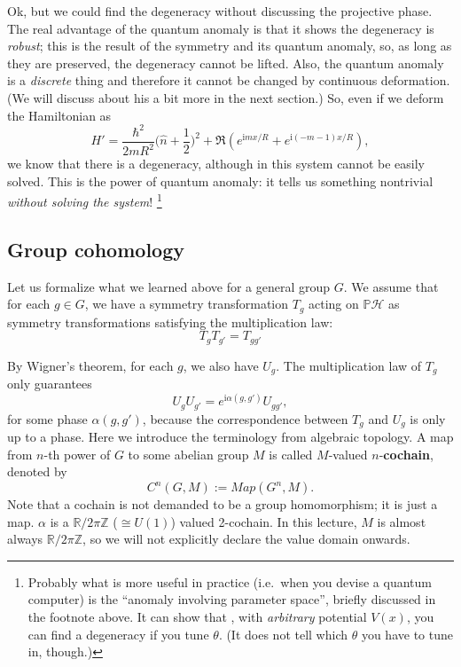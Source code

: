 \documentclass[
]{scrartcl}
\numberwithin{equation}{section}
\theoremstyle{definition}
\theoremstyle{definition}
\theoremstyle{definition}
\theoremstyle{definition}
\theoremstyle{remark}
\begin{document}
Ok, but we could find the degeneracy without discussing the projective phase. The real advantage of the quantum anomaly is that it shows the degeneracy is \emph{robust}; this is the result of the symmetry and its quantum anomaly, so, as long as they are preserved, the degeneracy cannot be lifted.
Also, the quantum anomaly is a \emph{discrete} thing and therefore it cannot be changed by continuous deformation. (We will discuss about his a bit more in the next section.)
So, even if we deform the Hamiltonian as
\begin{equation}
  \label{eq:ABringHamDef}
  H' = \frac{\hbar^2}{2mR^2}\bigl(\hat{n} + \frac{1}{2} \bigr)^2 + \Re(e^{\mathrm{i}m x/R}+e^{\mathrm{i}(-m-1)x/R}),
\end{equation}
we know that there is a degeneracy, although in this system cannot be easily solved.
This is the power of quantum anomaly: it tells us something nontrivial \emph{without solving the system}!
\footnote{Probably what is more useful in practice (i.e.~when you devise a quantum computer) is the ``anomaly involving parameter space'', briefly discussed in the footnote above. It can show that , with \emph{arbitrary} potential \(V(x)\), you can find a degeneracy if you tune \(\theta\). (It does not tell which \(\theta\) you have to tune in, though.)}

\hypertarget{group-cohomology}{%
\subsection{Group cohomology}\label{group-cohomology}}

Let us formalize what we learned above for a general group \(G\).
We assume that for each \(g\in G\), we have a symmetry transformation \(T_g\) acting on \(\mathbb{P}\mathcal{H}\) as symmetry transformations satisfying the multiplication law:
\begin{equation}
  \label{eq:Tmult}
  T_g T_{g'} = T_{gg'}
\end{equation}

By Wigner's theorem, for each \(g\), we also have \(U_g\).
The multiplication law of \(T_g\) only guarantees
\begin{equation}
  \label{eq:ProjRepGen}
  U_g U_{g'} = e^{\mathrm{i}\alpha(g,g')}U_{gg'},
\end{equation}
for some phase \(\alpha(g,g')\), because the correspondence between \(T_g\) and \(U_g\) is only up to a phase.
Here we introduce the terminology from algebraic topology.
A map from \(n\)-th power of \(G\) to some abelian group \(M\) is called \(M\)-valued \(n\)-\textbf{cochain}, denoted by
\begin{equation}
  \label{eq:GroupCochain}
  C^n(G,M) := Map(G^n,M).
\end{equation}
Note that a cochain is not demanded to be a group homomorphism; it is just a map.
\(\alpha\) is a \(\mathbb{R}/2\pi\mathbb{Z}\) (\(\cong U(1)\)) valued 2-cochain.
In this lecture, \(M\) is almost always \(\mathbb{R}/2\pi\mathbb{Z}\), so we will not explicitly declare the value domain onwards.
\end{document}
